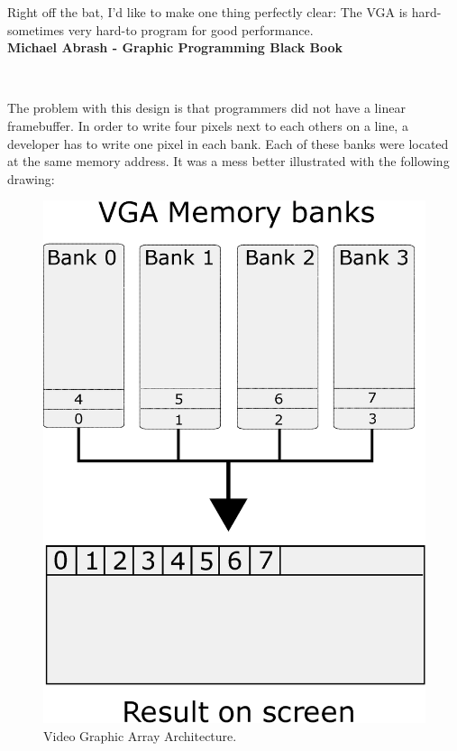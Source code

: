 \documentclass[book.tex]{subfiles}
\begin{document}
 \begin{fancyquotes}
   Right off the bat, I'd like to make one thing perfectly clear: The VGA is hard-sometimes very hard-to program for good performance.
 \bigskip \\
\textbf{Michael Abrash - Graphic Programming Black Book}
 \end{fancyquotes}
 \\
\par
The problem with this design is that programmers did not have a linear framebuffer. In order to write four pixels next to each others on a line, a developer has to write one pixel in each bank. Each of these banks were located at the same memory address. It was a mess better illustrated with the following drawing:\\
\par
\begin{figure}[H]
\centering
\includegraphics[width=\textwidth]{imgs/drawings/vga_ram_screen_layout.eps}
\caption{Video Graphic Array Architecture.}
\label{fig:vga_arch}
\end{figure}
\end{document}
